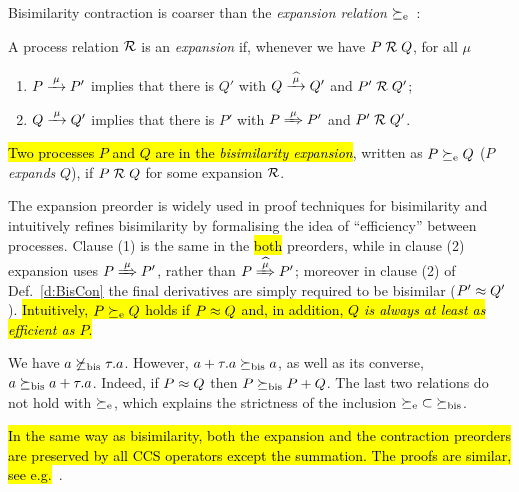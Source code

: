 Bisimilarity contraction is coarser than 
the \emph{expansion relation}
$\mathrel{\succeq_{\rm{e}}}$~\cite{arun1992efficiency,sangiorgi2015equations}:
\begin{definition}%
\label{d:expa}
A process relation ${{\cal R}}$
  is an \emph{expansion} if, whenever
we have $P\mathrel{\cal R} Q$, for all $\mu$
 \begin{enumerate}
 \item   $P \arr\mu P'$ implies that there is $Q'$ with $Q \arcap \mu  Q'$
  and $P' \mathrel{\cal R} Q'$;
 \item $Q \arr\mu Q'$   implies that there is $P'$ with $P \Arr \mu P'$ and $P' \mathrel{\cal R} Q'$.
 \end{enumerate}
\hl{Two processes $P$ and $Q$ are in the \emph{bisimilarity
    expansion}}, written as $P \mathrel{\succeq_{\rm{e}}} Q$ ($P$ \emph{expands} $Q$),
 if $P \mathrel{\cal R} Q$ for some expansion ${\cal R}$.
 \end{definition}
The expansion preorder is widely used in proof techniques for bisimilarity and
intuitively refines bisimilarity by 
formalising the idea of ``efficiency'' between processes.
Clause (1) is the same in the \hl{both}
preorders, while in clause (2) expansion uses 
$P \Arr \mu P'$, rather than $P \Arcap \mu P'$; 
moreover in clause (2) of Def.~\ref{d:BisCon} the final derivatives
are simply required to be bisimilar ($P' \approx Q'$).
\hl{Intuitively, $P \mathrel{\succeq_{\rm{e}}} Q$ holds if $P\approx Q$ and, in addition, \emph{$Q$
  is always at least as efficient as $P$}.}

\begin{example}
\label{exa:contr}
We have %
 $ a \not  \mathrel{\succeq_{\rm{bis}}} \tau. a$. However,
$a+ \tau . a \mathrel{\succeq_{\rm{bis}}} a$, as well as its converse, 
$  a \mathrel{\succeq_{\rm{bis}}} a +
\tau . a $. Indeed, if $P \approx Q$ then 
$  P  \mathrel{\succeq_{\rm{bis}}} P +Q$. The last two relations do not hold with 
$\mathrel{\succeq_{\rm{e}}}$, which explains the strictness of the inclusion
 ${\mathrel{\succeq_{\rm{e}}}} \subset {\mathrel{\succeq_{\rm{bis}}}}$. 
\end{example} 

\hl{In the same way as bisimilarity, both the expansion and the
contraction preorders are preserved by all CCS operators except the
summation. The proofs are similar, see e.g.}~\cite{sangiorgi2017equations}.

